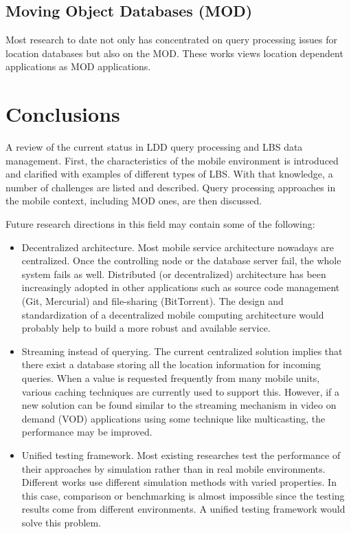 \documentclass[12pt,a4paper]{article}
\begin{document}
\subsection{Moving Object Databases (MOD)} %
\label{sub:moving_object_databases}
Most research to date not only has concentrated on query processing issues for location databases but also on the MOD. \cite{prasad1997modeling} \cite{wolfson1998moving} These works views location dependent applications as MOD applications.


\section{Conclusions} %
\label{sec:conclusions}
A review of the current status in LDD query processing and LBS data management. First, the characteristics of the mobile environment is introduced and clarified with examples of different types of LBS. With that knowledge, a number of challenges are listed and described. Query processing approaches in the mobile context, including MOD ones, are then discussed.

Future research directions in this field may contain some of the following:

\begin{itemize}
	\item Decentralized architecture. Most mobile service architecture nowadays are centralized. Once the controlling node or the database server fail, the whole system fails as well. Distributed (or decentralized) architecture has been increasingly adopted in other applications such as source code management (Git, Mercurial) and file-sharing (BitTorrent). The design and standardization of a decentralized mobile computing architecture would probably help to build a more robust and available service.
	\item Streaming instead of querying. The current centralized solution implies that there exist a database storing all the location information for incoming queries. When a value is requested frequently from many mobile units, various caching techniques are currently used to support this. However, if a new solution can be found similar to the streaming mechanism in video on demand (VOD) applications using some technique like multicasting, the performance may be improved.
	\item Unified testing framework. Most existing researches test the performance of their approaches by simulation rather than in real mobile environments. Different works use different simulation methods with varied properties. In this case, comparison or benchmarking is almost impossible since the testing results come from different environments. A unified testing framework would solve this problem.
\end{itemize}




\end{document}
